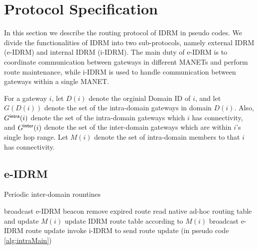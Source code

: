 \section{Protocol Specification}
\label{sec::specification}

In this section we describe the routing protocol of IDRM in pseudo codes. 
We divide the functionalities of IDRM into two sub-protocols, namely external
IDRM (e-IDRM) and internal IDRM (i-IDRM). 
The main duty of e-IDRM is to coordinate communication between gateways in
different MANETs and perform route maintenance, 
while i-IDRM is used to handle communication between gateways within
a single MANET.

For a gateway $i$, let $D(i)$ denote the orginial Domain ID of $i$,
and let $G(D(i))$ denote the set of the intra-domain gateways in domain $D(i)$.
Also, $G^{\sf intra}(i)$ denote the set of the intra-domain gateways
which $i$ has connectivity,
and $G^{\sf inter}(i)$ denote the set of the inter-domain
gateways which are within $i$'s single hop range. 
Let $M(i)$ denote the set of intra-domain members to that $i$ has connectivity.

\subsection{e-IDRM}
\label{sec::eidrm}  


\begin{algorithm}[htb!]
\caption{Periodic inter-domain rountines}
\label{alg:intertimer}
{\small
\begin{algorithmic}[1]
	\STATE broadcast e-IDRM beacon
\ENDIF
\STATE
{}
		\STATE remove expired route
	\ENDFOR
	\STATE read native ad-hoc routing table and update $M(i)$
	\STATE update IDRM route table according to $M(i)$
	\STATE
		\STATE broadcast e-IDRM route update
		\STATE invoke i-IDRM to send route update (in pseudo code
		\ref{alg:intraMain})
	\ENDIF
\ENDIF

\end{algorithmic} 
}
\end{algorithm} 

